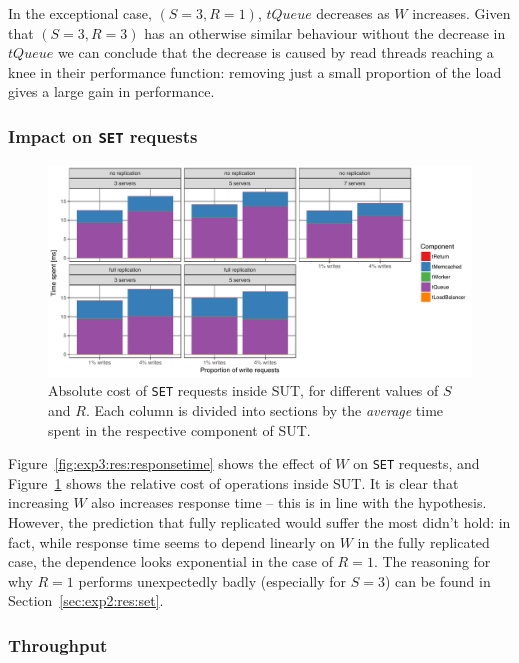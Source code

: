 \documentclass[11pt]{article}
\newcommand{\set}[0]{\texttt{SET}}
\begin{document}
In the exceptional case, $(S=3,R=1)$, $tQueue$ decreases as $W$ increases. Given that $(S=3,R=3)$ has an otherwise similar behaviour without the decrease in $tQueue$ we can conclude that the decrease is caused by read threads reaching a knee in their performance function: removing just a small proportion of the load gives a large gain in performance.

\subsubsection{Impact on \set{} requests}

\begin{figure}[h]
\centering
\includegraphics[width=\textwidth]{../results/writes/graphs/time_breakdown_vs_writes_set_abs.pdf}
\caption{Absolute cost of \set{} requests inside SUT, for different values of $S$ and $R$. Each column is divided into sections by the \emph{average} time spent in the respective component of SUT.}
\label{fig:exp3:res:breakdown:set:abs}
\end{figure}

Figure~\ref{fig:exp3:res:responsetime} shows the effect of $W$ on \set{} requests, and Figure~\ref{fig:exp3:res:breakdown:set:abs} shows the relative cost of operations inside SUT. It is clear that increasing $W$ also increases response time -- this is in line with the hypothesis. However, the prediction that fully replicated would suffer the most didn't hold: in fact, while response time seems to depend linearly on $W$ in the fully replicated case, the dependence looks exponential in the case of $R=1$. The reasoning for why $R=1$ performs unexpectedly badly (especially for $S=3$) can be found in Section~\ref{sec:exp2:res:set}.

\subsubsection{Throughput}
\end{document}

